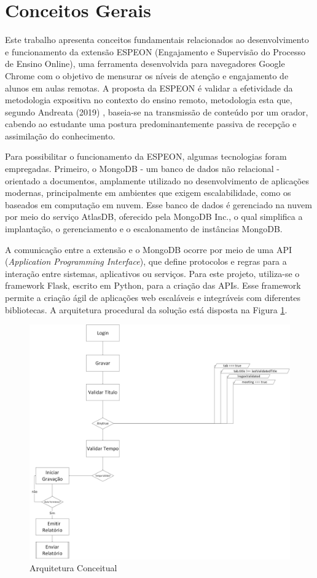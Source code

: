 \section{Conceitos Gerais}\label{sec:concepts}
Este trabalho apresenta conceitos fundamentais relacionados ao desenvolvimento e funcionamento da extensão ESPEON (Engajamento e Supervisão do Processo de Ensino Online), uma ferramenta desenvolvida para navegadores Google Chrome com o objetivo de mensurar os níveis de atenção e engajamento de alunos em aulas remotas. A proposta da ESPEON é validar a efetividade da metodologia expositiva no contexto do ensino remoto, metodologia esta que, segundo Andreata (2019) \cite{ANDREATA2019}, baseia-se na transmissão de conteúdo por um orador, cabendo ao estudante uma postura predominantemente passiva de recepção e assimilação do conhecimento.

Para possibilitar o funcionamento da ESPEON, algumas tecnologias foram empregadas. Primeiro, o MongoDB - um banco de dados não relacional - orientado a documentos, amplamente utilizado no desenvolvimento de aplicações modernas, principalmente em ambientes que exigem escalabilidade, como os baseados em computação em nuvem. Esse banco de dados é gerenciado na nuvem por meio do serviço AtlasDB, oferecido pela MongoDB Inc., o qual simplifica a implantação, o gerenciamento e o escalonamento de instâncias MongoDB.

A comunicação entre a extensão e o MongoDB ocorre por meio de uma API (\textit{Application Programming Interface}), que define protocolos e regras para a interação entre sistemas, aplicativos ou serviços. Para este projeto, utiliza-se o framework Flask, escrito em Python, para a criação das APIs. Esse framework permite a criação ágil de aplicações web escaláveis e integráveis com diferentes bibliotecas. A arquitetura procedural da solução está disposta na Figura \ref{fig:figura1}.

\begin{figure}[ht]
\centering
\includegraphics[width=.5\textwidth]{assets/images/arquitetura.png}
\caption{Arquitetura Conceitual}
\label{fig:figura1}
\end{figure}


